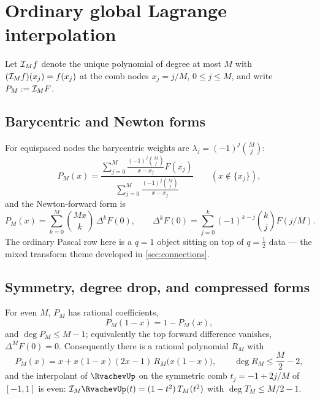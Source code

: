 \section{Ordinary global Lagrange interpolation}
\label{sec:ordinary}

Let $\mathcal I_M f$ denote the unique polynomial of degree at most $M$
with $(\mathcal I_Mf)(x_j)=f(x_j)$ at the comb nodes $x_j=j/M$,
$0\le j\le M$, and write $P_M:=\mathcal I_MF$.

\subsection{Barycentric and Newton forms}

For equispaced nodes the barycentric weights are
$\lambda_j=(-1)^{j}\binom Mj$:
\begin{equation}
 P_M(x)=
 \frac{\displaystyle\sum_{j=0}^{M}
 \frac{(-1)^{j}\binom Mj}{x-x_j}F(x_j)}
 {\displaystyle\sum_{j=0}^{M}
 \frac{(-1)^{j}\binom Mj}{x-x_j}}
 \qquad(x\notin\{x_j\}),
 \label{eq:bary-full}
\end{equation}
and the Newton-forward form is
\begin{equation}
 P_M(x)=\sum_{k=0}^{M}\binom{Mx}{k}\,\Delta^{k}F(0),
 \qquad
 \Delta^{k}F(0)=\sum_{j=0}^{k}(-1)^{k-j}\binom kjF(j/M).
 \label{eq:newton-forward}
\end{equation}
The ordinary Pascal row here is a $q=1$ object sitting on top of
$q=\tfrac12$ data --- the mixed transform theme developed in
\cref{sec:connections}.

\subsection{Symmetry, degree drop, and compressed forms}

\begin{proposition}
\label{prop:symmetry}
For even $M$, $P_M$ has rational coefficients,
\begin{equation}
 P_M(1-x)=1-P_M(x),
 \label{eq:P-symmetry}
\end{equation}
and $\deg P_M\le M-1$; equivalently the top forward difference
vanishes, $\Delta^{M}F(0)=0$.  Consequently there is a rational
polynomial $R_M$ with
\begin{equation}
 P_M(x)=x+x(1-x)(2x-1)\,R_M\bigl(x(1-x)\bigr),
 \qquad
 \deg R_M\le\frac M2-2,
 \label{eq:F-compressed}
\end{equation}
and the interpolant of $\RvachevUp$ on the symmetric comb
$t_j=-1+2j/M$ of $[-1,1]$ is even:
$\Lag_M\RvachevUp(t)=(1-t^{2})\,T_M(t^{2})$ with $\deg T_M\le M/2-1$.
\end{proposition}


